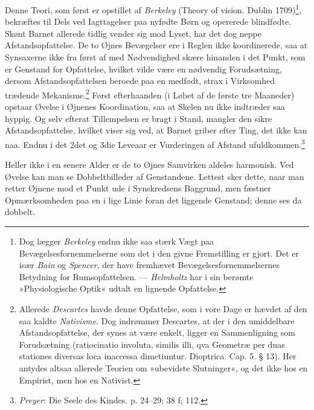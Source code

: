 \documentclass[12pt,a4paper,openany]{book}
\newcommand{\opage}[1]{\marginnote{\footnotesize\textit{[#1]}}}
\begin{document}
Denne Teori, som først er opstillet af \emph{Berkeley} (Theory of
vision. Dublin 1709)\footnote[1]{Dog lægger \emph{Berkeley} endnu ikke
saa stærk Vægt paa Bevægelsesfornemmelserne som det i den givne
Fremstilling er gjort. Det er især \emph{Bain} og \emph{Spencer}, der
have fremhævet Bevægelsesfornemmelsernes Betydning for Rumsopfattelsen.
--- \emph{Helmholtz} har i sin berømte »Physiologische Optik« udtalt en
lignende Opfattelse.}, bekræftes til Dels ved Iagttagelser paa nyfødte
Børn og opererede blindfødte. Skønt Barnet allerede tidlig vender sig
mod Lyset, har det dog neppe Afstandsopfattelse. De to Øjnes Bevægelser
ere i Reglen ikke koordinerede, saa at Synsaxerne ikke fra først af med
Nødvendighed skære hinanden i det Punkt, som er Genstand for Opfattelse,
hvilket vilde være en nødvendig Forudsætning, dersom Afstandsopfattelsen
beroede paa en medfødt, strax i Virksomhed trædende
Mekanisme.\footnote[2]{Allerede \emph{Descartes} havde denne Opfattelse,
som i vore Dage er hævdet af den saa kaldte \emph{Nativisme}. Dog
indrømmer Descartes, at der i den umiddelbare Afstandsopfattelse, der
synes at være enkelt, ligger en Sammenligning som Forudsætning
(ratiocinatio involuta, similis illi, qva Geometræ per duas stationes
diversas loca inaccessa dimetiuntur. Dioptrica. Cap. 5. § 13). Her
antydes altsaa allerede Teorien om »ubevidste Slutninger«, og det ikke
hos en Empirist, men hos en Nativist.} Først efterhaanden (i Løbet af de
første tre Maaneder) opstaar Øvelse i Øjnenes Koordination, saa at
Skelen nu ikke indtræder saa hyppig. Og selv efterat Tillempelsen er
bragt i Stand, mangler den sikre Afstandsopfattelse, hvilket viser sig
ved, at Barnet griber efter Ting, det ikke kan naa. Endnu i det 2det og
3die Leveaar er Vurderingen af Afstand
ufuldkommen.\footnote[3]{\emph{Preyer}: Die Seele des Kindes. p. 24--29;
38 f; 112.}

Heller ikke i en senere Alder er de to Øjnes Samvirken aldeles
harmonisk. Ved Øvelse kan man se Dobbeltbilleder af Genstandene. Lettest
sker dette, naar man retter Øjnene
\opage{239}mod et Punkt ude i Synskredsens Baggrund, men fæstner
Opmærksomheden paa en i lige Linie foran det liggende Genstand; denne
ses da dobbelt.
\end{document}
